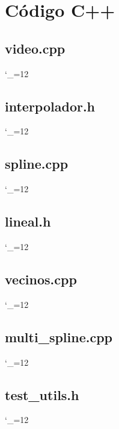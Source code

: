 \section{Código C++} \label{sec:codigo}

\newcommand{\codelst}{\begingroup
  \catcode`_=12 \docodelst}
\newcommand{\docodelst}[1]{%
  \endgroup
}

\subsection*{video.cpp}
\codelst{../src/video.cpp}
\subsection*{interpolador.h}
\codelst{../src/interpolador.h}
\subsection*{spline.cpp}
\codelst{../src/spline.cpp}
\subsection*{lineal.h}
\codelst{../src/lineal.cpp}
\subsection*{vecinos.cpp}
\codelst{../src/vecinos.cpp}
\subsection*{multi_spline.cpp}
\codelst{../src/multi_spline.cpp}
\subsection*{test_utils.h}
\codelst{../src/test_utils.h}
